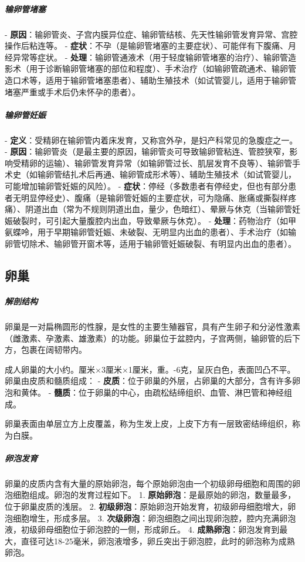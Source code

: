 \begin{enumerate}
\subparagraph{输卵管堵塞}
- \textbf{原因}：输卵管炎、子宫内膜异位症、输卵管结核、先天性输卵管发育异常、宫腔操作后粘连等。
- \textbf{症状}：不孕（是输卵管堵塞的主要症状）、可能伴有下腹痛、月经异常等症状。
- \textbf{处理}：输卵管通液术（用于轻度输卵管堵塞的治疗）、输卵管造影术（用于诊断输卵管堵塞的部位和程度）、手术治疗（如输卵管疏通术、输卵管造口术等，适用于输卵管堵塞患者）、辅助生殖技术（如试管婴儿，适用于输卵管堵塞严重或手术后仍未怀孕的患者）。

\subparagraph{输卵管妊娠}
- \textbf{定义}：受精卵在输卵管内着床发育，又称宫外孕，是妇产科常见的急腹症之一。
- \textbf{原因}：输卵管炎（是最主要的原因，输卵管炎可导致输卵管粘连、管腔狭窄，影响受精卵的运输）、输卵管发育异常（如输卵管过长、肌层发育不良等）、输卵管手术史（如输卵管结扎术后再通、输卵管成形术等）、辅助生殖技术（如试管婴儿，可能增加输卵管妊娠的风险）。
- \textbf{症状}：停经（多数患者有停经史，但也有部分患者无明显停经史）、腹痛（是输卵管妊娠的主要症状，可为隐痛、胀痛或撕裂样疼痛）、阴道出血（常为不规则阴道出血，量少，色暗红）、晕厥与休克（当输卵管妊娠破裂时，可引起大量腹腔内出血，导致晕厥与休克）。
- \textbf{处理}：药物治疗（如甲氨蝶呤，用于早期输卵管妊娠、未破裂、无明显内出血的患者）、手术治疗（如输卵管切除术、输卵管开窗术等，适用于输卵管妊娠破裂、有明显内出血的患者）。

\subsection{卵巢}

\subparagraph{解剖结构}
卵巢是一对扁椭圆形的性腺，是女性的主要生殖器官，具有产生卵子和分泌性激素（雌激素、孕激素、雄激素）的功能。卵巢位于盆腔内，子宫两侧，输卵管的后下方，包裹在阔韧带内。

成人卵巢的大小约。厘米×3厘米×1厘米，重。-6克，呈灰白色，表面凹凸不平。卵巢由皮质和髓质组成：
- \textbf{皮质}：位于卵巢的外层，占卵巢的大部分，含有许多卵泡和黄体。
- \textbf{髓质}：位于卵巢的中心，由疏松结缔组织、血管、淋巴管和神经组成。

卵巢表面由单层立方上皮覆盖，称为生发上皮，上皮下方有一层致密结缔组织，称为白膜。

\subparagraph{卵泡发育}
卵巢的皮质内含有大量的原始卵泡，每个原始卵泡由一个初级卵母细胞和周围的卵泡细胞组成。卵泡的发育过程如下。
1. \textbf{原始卵泡}：是最原始的卵泡，数量最多，位于卵巢皮质的浅层。
2. \textbf{初级卵泡}：原始卵泡开始发育，初级卵母细胞增大，卵泡细胞增生，形成多层。
3. \textbf{次级卵泡}：卵泡细胞之间出现卵泡腔，腔内充满卵泡液，初级卵母细胞位于卵泡腔的一侧，形成卵丘。
4. \textbf{成熟卵泡}：卵泡发育到最大，直径可达18-25毫米，卵泡液增多，卵丘突出于卵泡腔，此时的卵泡称为成熟卵泡。


\end{enumerate}
